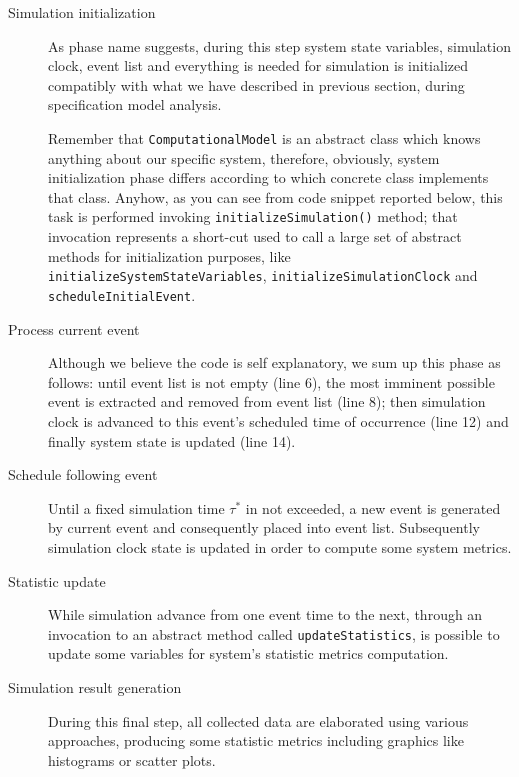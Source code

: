 \documentclass[10pt,a4paper]{article}
\begin{document}
\begin{description}
\item[Simulation initialization] As phase name suggests, during this step system state variables, simulation clock, event list and everything is needed for simulation is initialized compatibly with what we have described in previous section, during specification model analysis.

Remember that \texttt{ComputationalModel} is an abstract class which knows anything about our specific system, therefore, obviously, system initialization phase differs according to which concrete class implements that class. Anyhow, as you can see from code snippet reported below, this task is performed invoking \texttt{initialize\-Simulation()} method; that invocation represents a short-cut used to call a large set of abstract methods for initialization purposes, like \texttt{initializeSystemStateVariables}, \texttt{initializeSimulationClock} and \texttt{scheduleInitialEvent}.

\item[Process current event] Although we believe the code is self explanatory, we sum up this phase as follows: until event list is not empty (line 6), the most imminent possible event is extracted and removed from event list (line 8); then simulation clock is advanced to this event's scheduled time of occurrence (line 12) and finally system state is updated (line 14). 

\item[Schedule following event] Until a fixed simulation time $\tau^*$ in not exceeded, a new event is generated by current event and consequently placed into event list. Subsequently simulation clock state is updated in order to compute some system metrics.

\item[Statistic update] While simulation advance from one event time to the next, through an invocation to an abstract method called \texttt{updateStati\-stics}, is possible to update some variables for system's statistic metrics computation.

\item[Simulation result generation] During this final step, all collected data are elaborated using various approaches, producing some statistic metrics including graphics like histograms or scatter plots.
\end{description}
\end{document}
